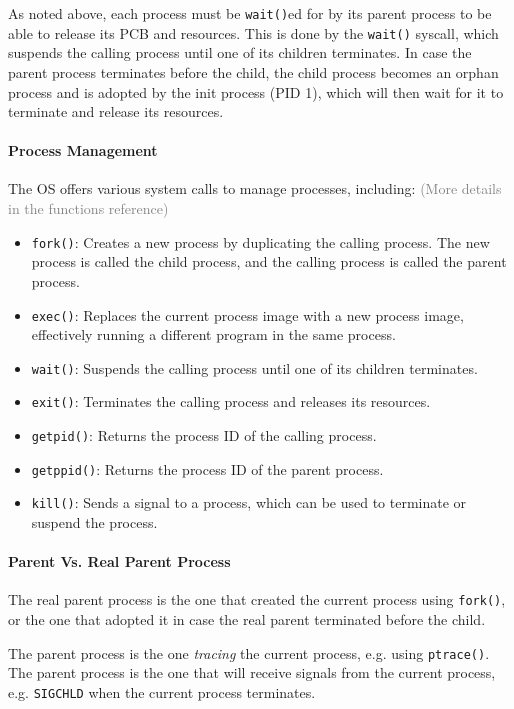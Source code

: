 \documentclass[openany,12pt]{book}
\newcommand{\code}[1]{\texttt{#1}}
\newcommand{\gray}[1]{\textcolor{gray}{#1}}
\begin{document}
\vspace{1em}

As noted above, each process must be \code{wait()}ed for by its parent process to be able to release its PCB and resources. This is done by the \texttt{wait()} syscall, which suspends the calling process until one of its children terminates. In case {\color{red} the parent process terminates before the child}, the child process {\color{red} becomes an orphan process and is adopted by the init process (PID 1)}, which will then wait for it to terminate and release its resources.


\paragraph{Process Management} The OS offers various system calls to manage processes, including: \gray{(More details in the functions reference)}
\begin{itemize}
    \item \texttt{fork()}: Creates a new process by duplicating the calling process. The new process is called the child process, and the calling process is called the parent process.
    \item \texttt{exec()}: Replaces the current process image with a new process image, effectively running a different program in the same process.
    \item \texttt{wait()}: Suspends the calling process until one of its children terminates.
    \item \texttt{exit()}: Terminates the calling process and releases its resources.
    \item \texttt{getpid()}: Returns the process ID of the calling process.
    \item \texttt{getppid()}: Returns the process ID of the parent process.
    \item \texttt{kill()}: Sends a signal to a process, which can be used to terminate or suspend the process.
\end{itemize}

\paragraph{Parent Vs. Real Parent Process}
The real parent process is the one that created the current process using \code{fork()}, or the one that adopted it in case the real parent terminated before the child.

The parent process is the one \textit{tracing} the current process, e.g. using \code{ptrace()}. The parent process is the one that will receive signals from the current process, e.g. \texttt{SIGCHLD} when the current process terminates.
\end{document}
